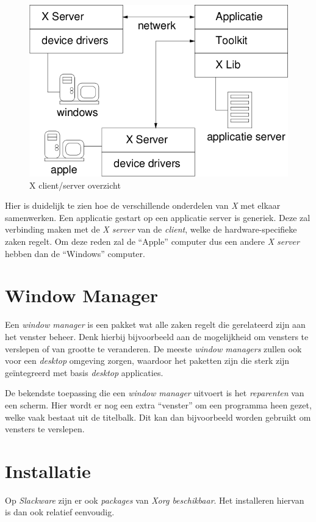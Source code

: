 \begin{figure}[h]
  \begin{center}
    \includegraphics[scale=0.4]{images/xserver2}
  \end{center}
  \caption{X client/server overzicht}
  \label{fig:xs2}
\end{figure}
Hier is duidelijk te zien hoe de verschillende onderdelen van \emph{X} met elkaar samenwerken. Een applicatie gestart op een applicatie server is generiek. Deze zal verbinding maken met de \emph{X server} van de \emph{client}, welke de hardware-specifieke zaken regelt. Om deze reden zal de ``Apple'' computer dus een andere \emph{X server} hebben dan de ``Windows'' computer. 

\section{Window Manager}
Een \emph{window manager} is een pakket wat alle zaken regelt die gerelateerd zijn aan het venster beheer. Denk hierbij bijvoorbeeld aan de mogelijkheid om vensters te verslepen of van grootte te veranderen. De meeste \emph{window managers} zullen ook voor een \emph{desktop} omgeving zorgen, waardoor het paketten zijn die sterk zijn ge\"{i}ntegreerd met basis \emph{desktop} applicaties. 

De bekendste toepassing die een \emph{window manager} uitvoert is het \emph{reparenten} van een scherm. Hier wordt er nog een extra ``venster'' om een programma heen gezet, welke vaak bestaat uit de titelbalk. Dit kan dan bijvoorbeeld worden gebruikt om vensters te verslepen. 

\section{Installatie}
Op \emph{Slackware} zijn er ook \emph{packages} van \emph{Xorg beschikbaar}. Het installeren hiervan is dan ook relatief eenvoudig. 

